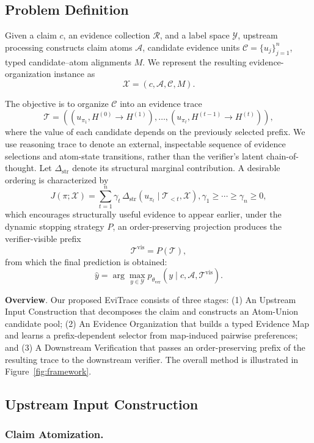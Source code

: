 \documentclass[letterpaper]{article}
\begin{document}
\subsection{Problem Definition}

Given a claim $c$, an evidence collection $\mathcal R$, and a label
space $\mathcal Y$, upstream processing constructs claim atoms
$\mathcal A$, candidate evidence units $\mathcal C=\{u_j\}_{j=1}^{n}$,
typed candidate--atom alignments $M$. We represent the resulting evidence-organization instance
as
\[
\mathcal X=(c,\mathcal A,\mathcal C,M).
\]

The objective is to organize $\mathcal C$ into an evidence
trace
\[
\mathcal T=((u_{\pi_1},H^{(0)}\to H^{(1)}),\ldots,(u_{\pi_t},H^{(t-1)}\to H^{(t)})),
\]
where the value of each candidate depends on the previously selected
prefix. 
We use reasoning trace to denote an external, 
inspectable sequence of evidence selections and atom-state transitions, rather than the verifier’s latent chain-of-thought.
Let $\Delta_{\mathrm{str}}$ denote its structural marginal
contribution. A desirable ordering is characterized by
\[
J(\pi;\mathcal X)
=
\sum_{t=1}^{n}\gamma_t\,
\Delta_{\mathrm{str}}
\!\left(
u_{\pi_t}\mid\mathcal T_{<t},\mathcal X
\right),
\gamma_1\ge\cdots\ge\gamma_n\ge0,
\]
which encourages structurally useful evidence to appear earlier, under the dynamic stopping strategy \(P\), an order-preserving projection
produces the verifier-visible prefix
\[
\mathcal T^{\mathrm{vis}}=P(\mathcal T),
\]
from which the final prediction is obtained:
\[
\hat y
=
\arg\max_{y\in\mathcal Y}
p_{\theta_{\mathrm{ver}}}
\left(y\mid c,\mathcal A,\mathcal T^{\mathrm{vis}}\right).
\]

\textbf{Overview}. Our proposed EviTrace consists of three stages: 
(1) An {Upstream Input Construction} that decomposes the claim and constructs an Atom-Union candidate pool; 
(2) An {Evidence Organization} that builds a typed Evidence Map and learns a prefix-dependent selector from map-induced pairwise preferences; and
(3) A {Downstream Verification} that passes an order-preserving prefix of the resulting trace to the downstream verifier. The overall method is illustrated in Figure~\ref{fig:framework}.

\subsection{Upstream Input Construction}

\subsubsection{Claim Atomization.}
\end{document}
